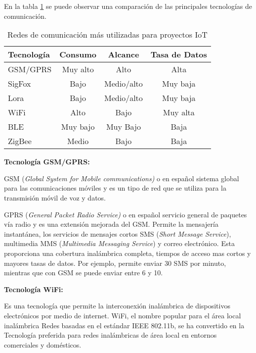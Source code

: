 En la tabla \ref{tab:Tecno} se puede observar una comparación de las principales tecnologías de comunicación.

\begin{table}[h]
	\centering
	\caption[Redes de comunicación]{Redes de comunicación más utilizadas para proyectos IoT}
	\begin{tabular}{l c c c}    
		\toprule
		\textbf{Tecnología} 	 & \textbf{Consumo}  & \textbf{Alcance} 	& \textbf{Tasa de Datos} \\
		\midrule
		GSM/GPRS				 & Muy alto			& Alto					&	Alta \\		
		SigFox					 & Bajo				& Medio/alto			&	Muy baja \\
		Lora					 & Bajo				& Medio/alto			&	Muy baja\\	
		WiFi					 & Alto				& Bajo					&	Muy alta \\
		BLE					 	 & Muy bajo			& Muy Bajo				&	Baja \\
		ZigBee					 & Medio			& Bajo					&	Baja \\	
		\bottomrule
		\hline
	\end{tabular}
	\label{tab:Tecno}
\end{table}

\textbf{Tecnología GSM/GPRS:}

GSM (\textit{Global System for Mobile communications)} o en español sistema global para las comunicaciones móviles y es un tipo de red que se utiliza para la transmisión móvil de voz y datos.

GPRS (\textit{General Packet Radio Service)} o en español servicio general de paquetes vía radio y es una extensión mejorada del GSM.
Permite la mensajería instantánea, los servicios de mensajes cortos SMS (\textit{Short Message Service}), multimedia MMS (\textit{Multimedia Messaging Service}) y correo electrónico. Esta proporciona una cobertura inalámbrica completa, tiempos de acceso mas cortos y mayores tasas de datos\citep{bettstetter1999gsm}. Por ejemplo, permite enviar 30 SMS por minuto, mientras que con GSM se puede enviar entre 6 y 10.

\textbf{Tecnología WiFi:}

Es una tecnología que permite la interconexión inalámbrica de dispositivos electrónicos por medio de internet. WiFi, el nombre popular para el área local inalámbrica Redes basadas en el estándar IEEE 802.11b, se ha convertido en la Tecnología preferida para redes inalámbricas de área local en entornos comerciales y domésticos\citep{henry2002wifi}.


